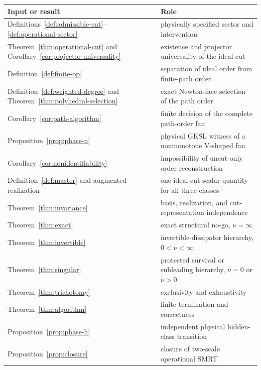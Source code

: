 \documentclass[11pt]{article}
\theoremstyle{definition}
\theoremstyle{remark}
\theoremstyle{plain}
\begin{document}
\begin{center}
\begin{tabularx}{\textwidth}{@{}>{\raggedright\arraybackslash}p{}X@{}}
\toprule
Input or result & Role\\
\midrule
Definitions~\ref{def:admissible-cut}--\ref{def:operational-sector} & physically specified sector and intervention\\
Theorem~\ref{thm:operational-cut} and Corollary~\ref{cor:projector-universality} & existence and projector universality of the ideal cut\\
Definition~\ref{def:finite-op} & separation of ideal order from finite-path order\\
Definition~\ref{def:weighted-degree} and Theorem~\ref{thm:polyhedral-selection} & exact Newton-face selection of the path order\\
Corollary~\ref{cor:path-algorithm} & finite decision of the complete path-order fan\\
Proposition~\ref{prop:phase-n} & physical GKSL witness of a nonmonotone V-shaped fan\\
Corollary~\ref{cor:nonidentifiability} & impossibility of uncut-only order reconstruction\\
Definition~\ref{def:master} and augmented realization & one ideal-cut scalar quantity for all three classes\\
Theorem~\ref{thm:invariance} & basis, realization, and cut-representation independence\\
Theorem~\ref{thm:exact} & exact structural no-go, $\nu=\infty$\\
Theorem~\ref{thm:invertible} & invertible-dissipator hierarchy, $0<\nu<\infty$\\
Theorem~\ref{thm:singular} & protected survival or subleading hierarchy, $\nu=0$ or $\nu>0$\\
Theorem~\ref{thm:trichotomy} & exclusivity and exhaustivity\\
Theorem~\ref{thm:algorithm} & finite termination and correctness\\
Proposition~\ref{prop:phase-h} & independent physical hidden-class transition\\
Proposition~\ref{prop:closure} & closure of two-scale operational SMRT\\
\bottomrule
\end{tabularx}
\end{center}
\end{document}
